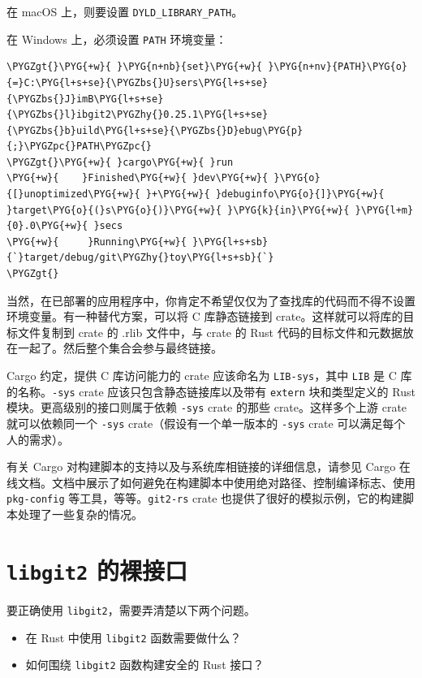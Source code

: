 在 macOS 上，则要设置 \texttt{DYLD\_LIBRARY\_PATH}。

在 Windows 上，必须设置 \texttt{PATH} 环境变量：

\begin{Verbatim}[commandchars=\\\{\},breaklines=true,breakanywhere=true,fontsize=\codefont,xleftmargin=17bp]
\PYGZgt{}\PYG{+w}{ }\PYG{n+nb}{set}\PYG{+w}{ }\PYG{n+nv}{PATH}\PYG{o}{=}C:\PYG{l+s+se}{\PYGZbs{}U}sers\PYG{l+s+se}{\PYGZbs{}J}imB\PYG{l+s+se}{\PYGZbs{}l}ibgit2\PYGZhy{}0.25.1\PYG{l+s+se}{\PYGZbs{}b}uild\PYG{l+s+se}{\PYGZbs{}D}ebug\PYG{p}{;}\PYGZpc{}PATH\PYGZpc{}
\PYGZgt{}\PYG{+w}{ }cargo\PYG{+w}{ }run
\PYG{+w}{    }Finished\PYG{+w}{ }dev\PYG{+w}{ }\PYG{o}{[}unoptimized\PYG{+w}{ }+\PYG{+w}{ }debuginfo\PYG{o}{]}\PYG{+w}{ }target\PYG{o}{(}s\PYG{o}{)}\PYG{+w}{ }\PYG{k}{in}\PYG{+w}{ }\PYG{l+m}{0}.0\PYG{+w}{ }secs
\PYG{+w}{     }Running\PYG{+w}{ }\PYG{l+s+sb}{`}target/debug/git\PYGZhy{}toy\PYG{l+s+sb}{`}
\PYGZgt{}
\end{Verbatim}

当然，在已部署的应用程序中，你肯定不希望仅仅为了查找库的代码而不得不设置环境变量。有一种替代方案，可以将 C 库静态链接到 crate。这样就可以将库的目标文件复制到 crate 的 .rlib 文件中，与 crate 的 Rust 代码的目标文件和元数据放在一起了。然后整个集合会参与最终链接。

Cargo 约定，提供 C 库访问能力的 crate 应该命名为 \texttt{LIB-sys}，其中 \texttt{LIB} 是 C 库的名称。\texttt{-sys} crate 应该只包含静态链接库以及带有 \texttt{extern} 块和类型定义的 Rust 模块。更高级别的接口则属于依赖 \texttt{-sys} crate 的那些 crate。这样多个上游 crate 就可以依赖同一个 \texttt{-sys} crate（假设有一个单一版本的 \texttt{-sys} crate 可以满足每个人的需求）。

有关 Cargo 对构建脚本的支持以及与系统库相链接的详细信息，请参见 Cargo 在线文档。文档中展示了如何避免在构建脚本中使用绝对路径、控制编译标志、使用 \texttt{pkg-config} 等工具，等等。\texttt{git2-rs} crate 也提供了很好的模拟示例，它的构建脚本处理了一些复杂的情况。

\section{\texttt{libgit2} 的裸接口}

要正确使用 \texttt{libgit2}，需要弄清楚以下两个问题。

\begin{itemize}
\item 在 Rust 中使用 \texttt{libgit2} 函数需要做什么？
\item 如何围绕 \texttt{libgit2} 函数构建安全的 Rust 接口？
\end{itemize}

